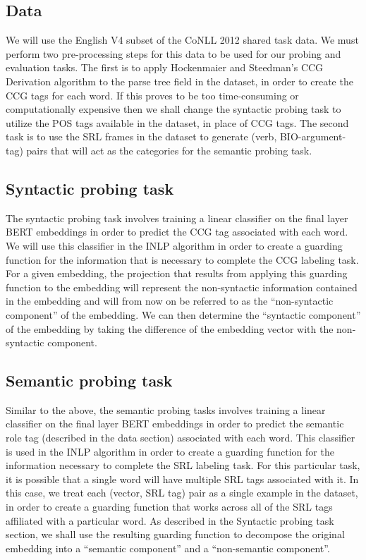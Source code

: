\documentclass[11pt,a4paper]{article}
\begin{document}
\subsection{Data}

We will use the English V4 subset of the CoNLL 2012 shared task data. We must perform two pre-processing steps for this data to be used for our probing and evaluation tasks. The first is to apply Hockenmaier and Steedman's CCG Derivation algorithm to the parse tree field in the dataset, in order to create the CCG tags for each word. If this proves to be too time-consuming or computationally expensive then we shall change the syntactic probing task to utilize the POS tags available in the dataset, in place of CCG tags. The second task is to use the SRL frames in the dataset to generate (verb, BIO-argument-tag) pairs that will act as the categories for the semantic probing task. 

\subsection{Syntactic probing task}

The syntactic probing task involves training a linear classifier on the final layer BERT embeddings in order to predict the CCG tag associated with each word. We will use this classifier in the INLP algorithm in order to create a guarding function for the information that is necessary to complete the CCG labeling task. For a given embedding, the projection that results from applying this guarding function to the embedding will represent the non-syntactic information contained in the embedding and will from now on be referred to as the ``non-syntactic component'' of the embedding. We can then determine the ``syntactic component'' of the embedding by taking the difference of the embedding vector with the non-syntactic component. 

\subsection{Semantic probing task}

Similar to the above, the semantic probing tasks involves training a linear classifier on the final layer BERT embeddings in order to predict the semantic role tag (described in the data section) associated with each word. This classifier is used in the INLP algorithm in order to create a guarding function for the information necessary to complete the SRL labeling task. For this particular task, it is possible that a single word will have multiple SRL tags associated with it. In this case, we treat each (vector, SRL tag) pair as a single example in the dataset, in order to create a guarding function that works across all of the SRL tags affiliated with a particular word. As described in the Syntactic probing task section, we shall use the resulting guarding function to decompose the original embedding into a ``semantic component'' and a ``non-semantic component''. 
\end{document}
